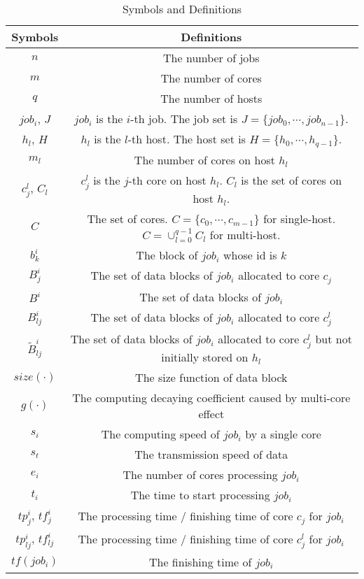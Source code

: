 \documentclass{llncs}
\begin{document}
\begin{appendices}
\begin{table}[htbp]
\caption{Symbols and Definitions}
\begin{center}
\begin{tabular}{c|c}
\toprule
\textbf{Symbols} &\textbf{Definitions}  \\
\midrule
$n$ & The number of jobs  \\
$m$ & The number of cores \\
$q$ & The number of hosts  \\
$job_i$, $J$ & $job_i$ is the $i$-th job. The job set is $J=\{job_0, \cdots, job_{n-1}\}$. \\
$h_l$, $H$ & $h_l$ is the $l$-th  host. The host set is $H=\{h_0, \cdots, h_{q-1}\}$. \\
$m_l$ & The number of cores on host $h_l$\\
$c^l_j$, $C_l$ & $c^l_j$ is the $j$-th core on host $h_l$. $C_l$ is the set of cores on host $h_l$.\\
$C$ & The set of cores. $C=\{c_0,\cdots,c_{m-1}\}$ for single-host. $C=\cup_{l=0}^{q-1} C_l$ for multi-host.\\
$b^i_k$& The block of $job_i$ whose id is $k$\\
$B^i_{j}$ & The set of data blocks of $job_i$ allocated to core $c_j$ \\
$B^i$ & The set of data blocks of $job_i$ \\
$B^i_{lj}$ & The set of data blocks of $job_i$ allocated to core $c^l_j$ \\
$\widetilde{B}^i_{lj}$ & The set of data blocks of $job_i$ allocated to core $c^l_j$ but not initially stored on $h_l$\\
$size(\cdot)$ & The size function of data block\\
$g(\cdot)$ &  The computing decaying coefficient caused by multi-core effect\\
$s_i$ & The computing speed of $job_i$ by a single core\\
$s_t$ & The transmission speed of data \\
$e_i$ & The number of cores processing $job_i$\\
$t_i$ & The time to start processing $job_i$\\
$tp^i_j$, $tf^i_{j}$ & The processing time / finishing time of core $c_j$ for $job_i$\\
$tp^i_{lj}$, $tf^i_{lj}$ & The processing time / finishing time of core $c^l_j$ for $job_i$\\
$tf(job_i)$ & The finishing time of $job_i$ \\


\end{tabular}
\end{center}
\end{table}
\end{appendices}
\end{document}
